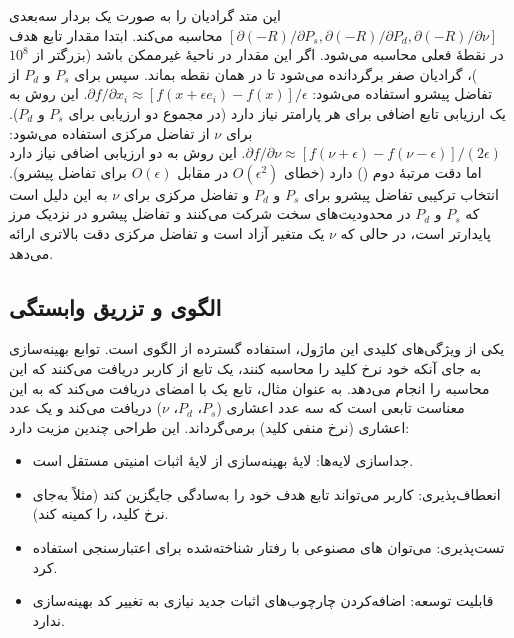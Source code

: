 این متد گرادیان را به صورت یک بردار سه‌بعدی $[\partial(-R)/\partial P_s, \partial(-R)/\partial P_d, \partial(-R)/\partial \nu]$ محاسبه می‌کند. ابتدا مقدار تابع هدف در نقطۀ فعلی محاسبه می‌شود. اگر این مقدار در ناحیۀ غیرممکن باشد (بزرگتر از $10^8$)، گرادیان صفر برگردانده می‌شود تا  در همان نقطه بماند. سپس برای $P_s$ و $P_d$ از تفاضل پیشرو استفاده می‌شود: $\partial f / \partial x_i \approx [f(x + \epsilon e_i) - f(x)] / \epsilon$. این روش به یک ارزیابی تابع اضافی برای هر پارامتر نیاز دارد (در مجموع دو ارزیابی برای $P_s$ و $P_d$). برای $\nu$ از تفاضل مرکزی استفاده می‌شود: $\partial f / \partial \nu \approx [f(\nu + \epsilon) - f(\nu - \epsilon)] / (2\epsilon)$. این روش به دو ارزیابی اضافی نیاز دارد اما دقت مرتبۀ دوم () دارد (خطای $O(\epsilon^2)$ در مقابل $O(\epsilon)$ برای تفاضل پیشرو). انتخاب ترکیبی تفاضل پیشرو برای $P_s$ و $P_d$ و تفاضل مرکزی برای $\nu$ به این دلیل است که $P_s$ و $P_d$ در محدودیت‌های سخت شرکت می‌کنند و تفاضل پیشرو در نزدیک مرز پایدارتر است، در حالی که $\nu$ یک متغیر آزاد است و تفاضل مرکزی دقت بالاتری ارائه می‌دهد.

\subsection{الگوی  و تزریق وابستگی}

یکی از ویژگی‌های کلیدی این ماژول، استفاده گسترده از الگوی  است. توابع بهینه‌سازی به جای آنکه خود نرخ کلید را محاسبه کنند، یک تابع  از کاربر دریافت می‌کنند که این محاسبه را انجام می‌دهد. به عنوان مثال، تابع  یک  با امضای  دریافت می‌کند که به این معناست تابعی است که سه عدد اعشاری ($P_s$، $P_d$، $\nu$) دریافت می‌کند و یک عدد اعشاری (نرخ منفی کلید) برمی‌گرداند. این طراحی چندین مزیت دارد:

\begin{itemize}
	\item جداسازی لایه‌ها: لایۀ بهینه‌سازی از لایۀ اثبات امنیتی مستقل است.
	\item انعطاف‌پذیری: کاربر می‌تواند تابع هدف خود را به‌سادگی جایگزین کند (مثلاً به‌جای نرخ کلید،  را کمینه کند).
	\item تست‌پذیری: می‌توان ‌های مصنوعی با رفتار شناخته‌شده برای اعتبارسنجی استفاده کرد.
	\item قابلیت توسعه: اضافه‌کردن چارچوب‌های اثبات جدید نیازی به تغییر کد بهینه‌سازی ندارد.
\end{itemize}

